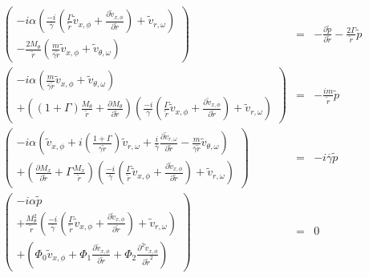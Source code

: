 \begin{eqnarray}
\left(
\begin{array}{r}
-i \alpha 
\left(
\frac{-i}{ \overline{\gamma}}
\left(
\frac{\Gamma}{\widetilde{r}}
\widetilde{v}_{x,\phi}
+
\frac{\partial \widetilde{v}_{x,\phi}}{\partial \widetilde{r}} 
\right)
+\widetilde{v}_{r,\omega} 
\right)
\\
-\frac{2 M_{\theta}}{\widetilde{r}} 
\left(
\frac{m}{\overline{\gamma} \widetilde{r}} \widetilde{v}_{x,\phi}
+\widetilde{v}_{\theta,\omega} 
\right)
\end{array}
\right)
&=&
-
\frac{\partial \widetilde{p} }{\partial \widetilde{r}} 
-
\frac{2 \Gamma}{\widetilde{r}} \widetilde{p}
\nonumber
\\
\left(
\begin{array}{r}
-i
\alpha
\left(
\frac{m}{\overline{\gamma} \widetilde{r}} \widetilde{v}_{x,\phi}
+\widetilde{v}_{\theta,\omega} 
\right)
\\
+
\left(
\left(1 + \Gamma \right)
\frac{M_{\theta} }{\widetilde{r}}
+
\frac{\partial M_{\theta} }{\partial \widetilde{r}}
\right) 
\left(
\frac{-i}{ \overline{\gamma}}
\left(
\frac{\Gamma}{\widetilde{r}}
\widetilde{v}_{x,\phi}
+
\frac{\partial \widetilde{v}_{x,\phi}}{\partial \widetilde{r}} 
\right)
+\widetilde{v}_{r,\omega} 
\right)
\end{array}
\right)
&=&
-\frac{i m }{\widetilde{r} } \widetilde{p}
\nonumber
\\
\left(
\begin{array}{r}
-i
\alpha
\left(
\widetilde{v}_{x,\phi} 
+
i
\left(
\frac{ 1 + \Gamma}{\overline{\gamma} \widetilde{r}}
\right)
 \widetilde{v}_{r,\omega}
+ 
\frac{i}{\overline{\gamma}}
\frac{\partial \widetilde{v}_{r,\omega}}{\partial \widetilde{r}}
- \frac{m}{\overline{\gamma} \widetilde{r}} \widetilde{v}_{\theta,\omega}
\right)
\\
+
\left(
\frac{\partial M_x }{\partial \widetilde{r}} 
+
\Gamma \frac{M_x }{\widetilde{r}}
\right)
\left(
\frac{-i}{ \overline{\gamma}}
\left(
\frac{\Gamma}{\widetilde{r}}
\widetilde{v}_{x,\phi}
+
\frac{\partial \widetilde{v}_{x,\phi}}{\partial \widetilde{r}} 
\right)
+\widetilde{v}_{r,\omega} 
\right)
\end{array}
\right)
&=&
-i \overline{\gamma} \widetilde{p}
\nonumber
\\
\left(
\begin{array}{r}
-i
\alpha
 \widetilde{p}
\\
+
\frac{M_{\theta}^2}{\widetilde{r}}
\left(
\frac{-i}{ \overline{\gamma}}
\left(
\frac{\Gamma}{\widetilde{r}}
\widetilde{v}_{x,\phi}
+
\frac{\partial \widetilde{v}_{x,\phi}}{\partial \widetilde{r}} 
\right)
+\widetilde{v}_{r,\omega} 
\right)
\\
+ 
\left(
\Phi_0 
\widetilde{v}_{x,\phi}
+\Phi_1 
\frac{\partial
\widetilde{v}_{x,\phi}
}{\partial \widetilde{r}} 
+\Phi_2 
\frac{\partial^2
\widetilde{v}_{x,\phi}
}{\partial \widetilde{r}^2} 
\right)
\end{array}
\right)
&=&
0
\nonumber
\end{eqnarray}

